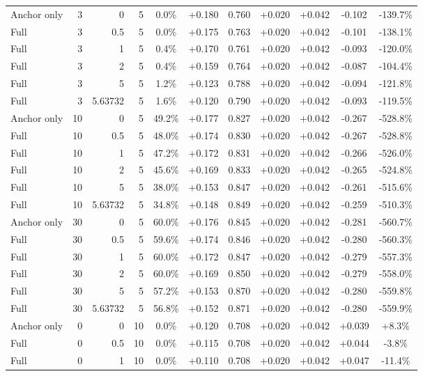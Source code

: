 \begin{table}[htbp]
\begin{tabular}{lrrrccccccc}
Anchor only & 3 & 0 & 5 & 0.0\% & +0.180 & 0.760 & +0.020 & +0.042 & -0.102 & -139.7\% \\
Full & 3 & 0.5 & 5 & 0.0\% & +0.175 & 0.763 & +0.020 & +0.042 & -0.101 & -138.1\% \\
Full & 3 & 1 & 5 & 0.4\% & +0.170 & 0.761 & +0.020 & +0.042 & -0.093 & -120.0\% \\
Full & 3 & 2 & 5 & 0.4\% & +0.159 & 0.764 & +0.020 & +0.042 & -0.087 & -104.4\% \\
Full & 3 & 5 & 5 & 1.2\% & +0.123 & 0.788 & +0.020 & +0.042 & -0.094 & -121.8\% \\
Full & 3 & 5.63732 & 5 & 1.6\% & +0.120 & 0.790 & +0.020 & +0.042 & -0.093 & -119.5\% \\
Anchor only & 10 & 0 & 5 & 49.2\% & +0.177 & 0.827 & +0.020 & +0.042 & -0.267 & -528.8\% \\
Full & 10 & 0.5 & 5 & 48.0\% & +0.174 & 0.830 & +0.020 & +0.042 & -0.267 & -528.8\% \\
Full & 10 & 1 & 5 & 47.2\% & +0.172 & 0.831 & +0.020 & +0.042 & -0.266 & -526.0\% \\
Full & 10 & 2 & 5 & 45.6\% & +0.169 & 0.833 & +0.020 & +0.042 & -0.265 & -524.8\% \\
Full & 10 & 5 & 5 & 38.0\% & +0.153 & 0.847 & +0.020 & +0.042 & -0.261 & -515.6\% \\
Full & 10 & 5.63732 & 5 & 34.8\% & +0.148 & 0.849 & +0.020 & +0.042 & -0.259 & -510.3\% \\
Anchor only & 30 & 0 & 5 & 60.0\% & +0.176 & 0.845 & +0.020 & +0.042 & -0.281 & -560.7\% \\
Full & 30 & 0.5 & 5 & 59.6\% & +0.174 & 0.846 & +0.020 & +0.042 & -0.280 & -560.3\% \\
Full & 30 & 1 & 5 & 60.0\% & +0.172 & 0.847 & +0.020 & +0.042 & -0.279 & -557.3\% \\
Full & 30 & 2 & 5 & 60.0\% & +0.169 & 0.850 & +0.020 & +0.042 & -0.279 & -558.0\% \\
Full & 30 & 5 & 5 & 57.2\% & +0.153 & 0.870 & +0.020 & +0.042 & -0.280 & -559.8\% \\
Full & 30 & 5.63732 & 5 & 56.8\% & +0.152 & 0.871 & +0.020 & +0.042 & -0.280 & -559.9\% \\
Anchor only & 0 & 0 & 10 & 0.0\% & +0.120 & 0.708 & +0.020 & +0.042 & +0.039 & +8.3\% \\
Full & 0 & 0.5 & 10 & 0.0\% & +0.115 & 0.708 & +0.020 & +0.042 & +0.044 & -3.8\% \\
Full & 0 & 1 & 10 & 0.0\% & +0.110 & 0.708 & +0.020 & +0.042 & +0.047 & -11.4\% \\

\end{tabular}
\end{table}
